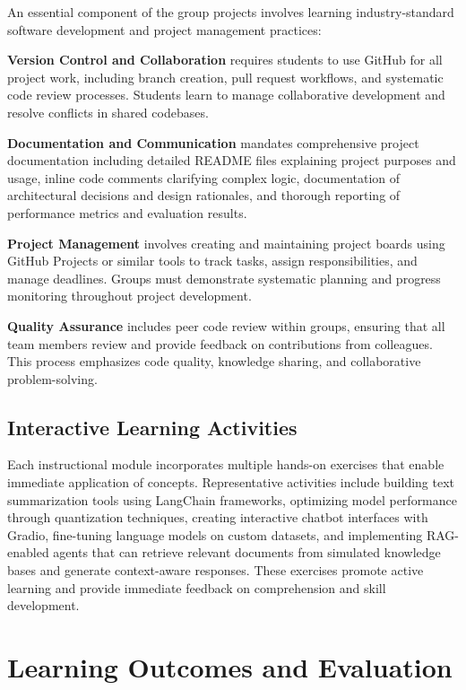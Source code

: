 \documentclass{article}
\begin{document}
An essential component of the group projects involves learning industry-standard software development and project management practices:

\textbf{Version Control and Collaboration} requires students to use GitHub for all project work, including branch creation, pull request workflows, and systematic code review processes. Students learn to manage collaborative development and resolve conflicts in shared codebases.

\textbf{Documentation and Communication} mandates comprehensive project documentation including detailed README files explaining project purposes and usage, inline code comments clarifying complex logic, documentation of architectural decisions and design rationales, and thorough reporting of performance metrics and evaluation results.

\textbf{Project Management} involves creating and maintaining project boards using GitHub Projects or similar tools to track tasks, assign responsibilities, and manage deadlines. Groups must demonstrate systematic planning and progress monitoring throughout project development.

\textbf{Quality Assurance} includes peer code review within groups, ensuring that all team members review and provide feedback on contributions from colleagues. This process emphasizes code quality, knowledge sharing, and collaborative problem-solving.

\subsection{Interactive Learning Activities}

Each instructional module incorporates multiple hands-on exercises that enable immediate application of concepts. Representative activities include building text summarization tools using LangChain frameworks, optimizing model performance through quantization techniques, creating interactive chatbot interfaces with Gradio, fine-tuning language models on custom datasets, and implementing RAG-enabled agents that can retrieve relevant documents from simulated knowledge bases and generate context-aware responses. These exercises promote active learning and provide immediate feedback on comprehension and skill development.

\section{Learning Outcomes and Evaluation}
\end{document}
